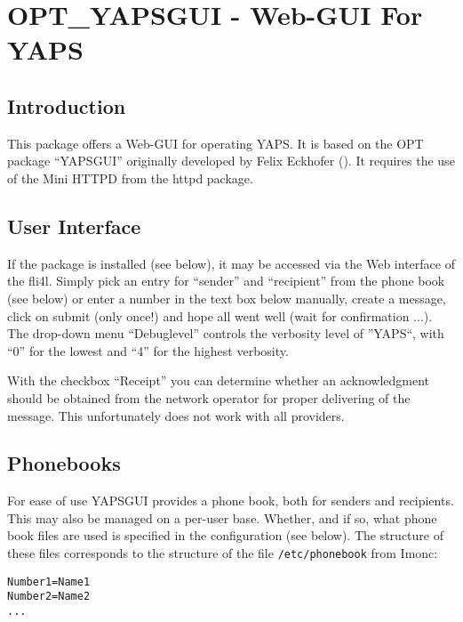 \section {OPT\_YAPSGUI - Web-GUI For YAPS}

\subsection {Introduction}

This package offers a Web-GUI for operating YAPS. It is based on the
OPT package ``YAPSGUI'' originally developed by Felix Eckhofer
(). It requires the use of the Mini HTTPD
from the httpd package.

\subsection {User Interface}

If the package is installed (see below), it may be accessed via the Web interface
of the fli4l. Simply pick an entry for ``sender'' and ``recipient'' from the phone
book (see below) or enter a number in the text box below manually, create a message,
click on submit (only once!) and hope all went well (wait for confirmation ...).
The drop-down menu ``Debuglevel'' controls the verbosity level of ''YAPS``, with
``0'' for the lowest and ``4'' for the highest verbosity.

With the checkbox ``Receipt'' you can determine whether an acknowledgment
should be obtained from the network operator for proper delivering of the message.
This unfortunately does not work with all providers.

\subsection {Phonebooks}

For ease of use YAPSGUI provides a phone book, both for senders and recipients.
This may also be managed on a per-user base. Whether, and if so, what phone book
files are used is specified in the configuration (see below). The structure of these files
corresponds to the structure of the file \texttt{/etc/phonebook} from Imonc:

\begin{small}
\begin{example}
\begin{verbatim}
Number1=Name1
Number2=Name2
...
\end{verbatim}
\end{example}
\end{small}

